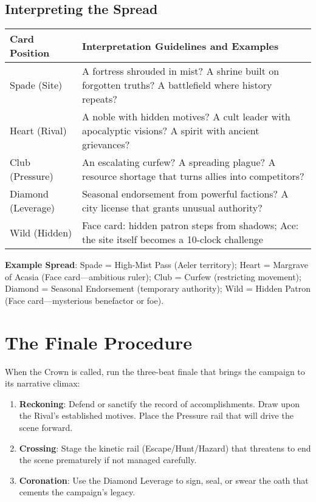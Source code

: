 \subsection*{Interpreting the Spread}

\begin{fatebox}
\begin{tabularx}{\textwidth}{lX}
\toprule
\textbf{Card Position} & \textbf{Interpretation Guidelines and Examples} \\
\midrule
Spade (Site) & A fortress shrouded in mist? A shrine built on forgotten truths? A battlefield where history repeats? \\
Heart (Rival) & A noble with hidden motives? A cult leader with apocalyptic visions? A spirit with ancient grievances? \\
Club (Pressure) & An escalating curfew? A spreading plague? A resource shortage that turns allies into competitors? \\
Diamond (Leverage) & Seasonal endorsement from powerful factions? A city license that grants unusual authority? \\
Wild (Hidden) & Face card: hidden patron steps from shadows; Ace: the site itself becomes a 10-clock challenge \\
\bottomrule
\end{tabularx}
\end{fatebox}

\textbf{Example Spread}: Spade = High-Mist Pass (Aeler territory); Heart = Margrave of Acasia (Face card---ambitious ruler); Club = Curfew (restricting movement); Diamond = Seasonal Endorsement (temporary authority); Wild = Hidden Patron (Face card---mysterious benefactor or foe).

\section*{The Finale Procedure}

When the Crown is called, run the three-beat finale that brings the campaign to its narrative climax:

\begin{enumerate}
    \item \textbf{Reckoning}: Defend or sanctify the record of accomplishments. Draw upon the Rival's established motives. Place the Pressure rail that will drive the scene forward.
    \item \textbf{Crossing}: Stage the kinetic rail (Escape/Hunt/Hazard) that threatens to end the scene prematurely if not managed carefully.
    \item \textbf{Coronation}: Use the Diamond Leverage to sign, seal, or swear the oath that cements the campaign's legacy.
\end{enumerate}

